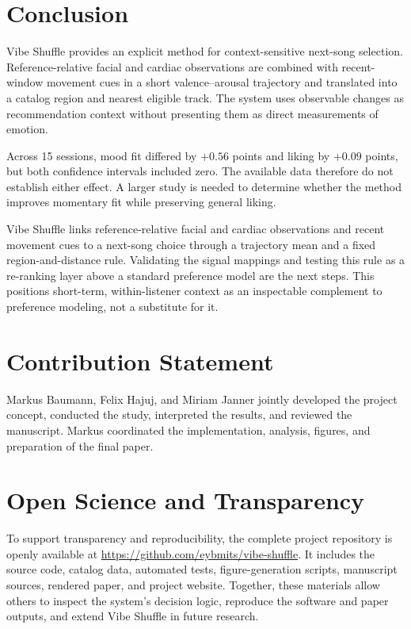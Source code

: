 \section{Conclusion}

Vibe Shuffle provides an explicit method for context-sensitive next-song
selection. Reference-relative facial and cardiac observations are combined with
recent-window movement cues in a short valence--arousal trajectory and translated
into a catalog region and nearest eligible track. The system uses observable
changes as recommendation context without presenting them as direct
measurements of emotion.

Across 15 sessions, mood fit differed by $+0.56$ points and liking by $+0.09$
points, but both confidence intervals included zero. The available data
therefore do not establish either effect. A larger study is needed to determine
whether the method improves momentary fit while preserving general liking.

Vibe Shuffle links reference-relative facial and cardiac observations and recent
movement cues to a next-song choice through a trajectory mean and a fixed
region-and-distance rule. Validating the signal mappings and testing this rule as a re-ranking layer
above a standard preference model are the next steps. This positions short-term,
within-listener context as an inspectable complement to preference modeling,
not a substitute for it.

\section{Contribution Statement}

Markus Baumann, Felix Hajuj, and Miriam Janner jointly developed the project
concept, conducted the study, interpreted the results, and reviewed the
manuscript. Markus coordinated the implementation, analysis, figures, and
preparation of the final paper.

\section*{Open Science and Transparency}

To support transparency and reproducibility, the complete project repository is
openly available at \url{https://github.com/eybmits/vibe-shuffle}. It includes
the source code, catalog data, automated tests, figure-generation scripts,
manuscript sources, rendered paper, and project website. Together, these
materials allow others to inspect the system's decision logic, reproduce the
software and paper outputs, and extend Vibe Shuffle in future research.

